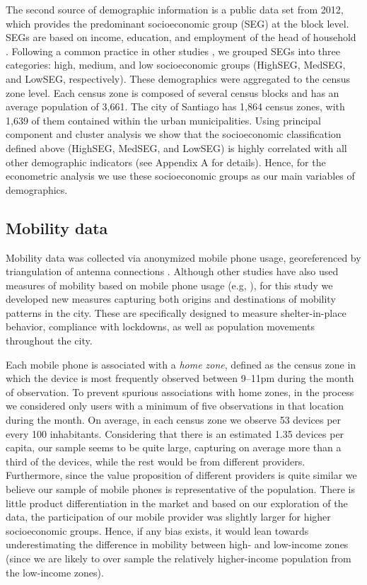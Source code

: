 The second source of demographic information is a public data set from 2012, which provides the predominant socioeconomic group (SEG) at the block level. SEGs are based on income, education, and employment of the head of household \citep{meier2004social}. Following a common practice in other studies  \citep{romero2012assessing, hernandez2018twelve}, we grouped SEGs into three categories: high, medium, and low socioeconomic groups (HighSEG, MedSEG, and LowSEG, respectively). These demographics were aggregated to the census zone level. Each census zone is composed of several census blocks and has an average population of 3,661. The city of Santiago has 1,864 census zones, with 1,639 of them contained within the urban municipalities. Using principal component and cluster analysis we show that the socioeconomic classification defined above (HighSEG, MedSEG, and LowSEG) is highly correlated with all other demographic indicators (see Appendix A for details). Hence, for the econometric analysis we use these socioeconomic groups as our main variables of demographics. %

\subsection{Mobility data} \label{sec:mobility}

Mobility data was collected via anonymized mobile phone usage, georeferenced by triangulation of antenna connections \citep{drane1998positioning}. Although other studies have also used measures of mobility based on mobile phone usage (e.g, \cite{GoogleMobilityReport, SafeGraph}), for this study we developed new  measures capturing both origins and destinations of mobility patterns in the city. These are specifically designed to measure shelter-in-place behavior, compliance with lockdowns, as well as population movements throughout the city.

Each mobile phone is associated with a \textit{home zone}, defined as the census zone in which the device is most frequently observed between 9--11pm during the month of observation. To prevent spurious associations with home zones, in the process we considered only users with a minimum of five observations in that location during the month. On average, in each census zone we observe 53 devices per every 100 inhabitants. Considering that there is an estimated 1.35 devices per capita, our sample seems to be quite large, capturing on average more than a third of the devices, while the rest would be from different providers. Furthermore, since the value proposition of different providers is quite similar we believe our sample of mobile phones is representative of the population. There is little product differentiation in the market and based on our exploration of the data, the participation of our mobile provider was slightly larger for higher socioeconomic groups. Hence, if any bias exists, it would lean towards underestimating the difference in mobility between high- and
low-income zones (since we are likely to over sample the relatively higher-income population from the low-income zones).

